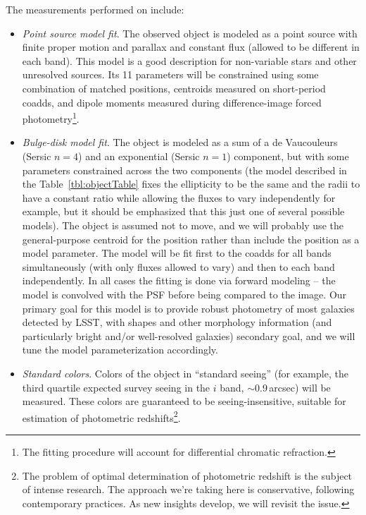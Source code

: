 The measurements performed on \Objects include:
%
\begin{itemize}
    \item \emph{Point source model fit}. The observed object is modeled as a point source with finite proper motion and parallax and constant flux (allowed to be different in each band).  This model is a good description for non-variable stars and other unresolved sources. Its 11 parameters will be constrained using some combination of matched \Source positions, centroids measured on short-period coadds, and dipole moments measured during difference-image forced photometry\footnote{The fitting procedure will account for differential chromatic refraction.}.

    \item \emph{Bulge-disk model fit}.  The object is modeled as a sum of a de Vaucouleurs (Sersic $n=4$) and an exponential (Sersic $n=1$) component, but with some parameters constrained across the two components (the model described in the Table~\ref{tbl:objectTable} fixes the ellipticity to be the same and the radii to have a constant ratio while allowing the fluxes to vary independently for example, but it should be emphasized that this just one of several possible models).
    The object is assumed not to move, and we will probably use the general-purpose centroid for the position rather than include the position as a model parameter.  The model will be fit first to the coadds for all bands simultaneously (with only fluxes allowed to vary) and then to each band independently.
    In all cases the fitting is done via forward modeling -- the model is convolved with the PSF before being compared to the image.
    Our primary goal for this model is to provide robust photometry of most galaxies detected by LSST, with shapes and other morphology information (and particularly bright and/or well-resolved galaxies) secondary goal, and we will tune the model parameterization accordingly.

    \item \emph{Standard colors}.  Colors of the object in ``standard seeing'' (for example, the third quartile expected survey seeing in the $i$ band, $\sim$0.9\,arcsec) will be measured. These colors are guaranteed to be seeing-insensitive,  suitable for estimation of photometric redshifts\footnote{The problem of optimal determination of photometric redshift is the subject of intense research. The approach we're taking here is conservative, following contemporary practices. As new insights develop, we will revisit the issue.}.


\end{itemize}
